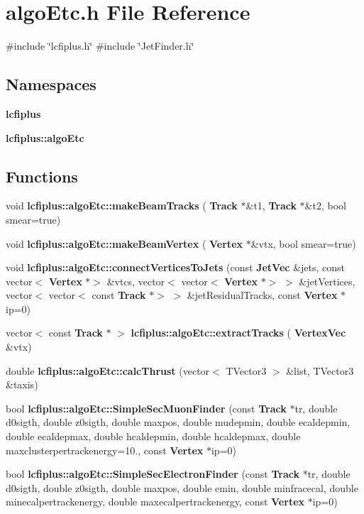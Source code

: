 \section{algo\+Etc.\+h File Reference}
\label{algoEtc_8h}
{\ttfamily \#include \char`\"{}lcfiplus.\+h\char`\"{}}\newline
{\ttfamily \#include \char`\"{}Jet\+Finder.\+h\char`\"{}}\newline
\subsection*{Namespaces}
\begin{DoxyCompactItemize}
\item 
 \textbf{ lcfiplus}
\item 
 \textbf{ lcfiplus\+::algo\+Etc}
\end{DoxyCompactItemize}
\subsection*{Functions}
\begin{DoxyCompactItemize}
\item 
void \textbf{ lcfiplus\+::algo\+Etc\+::make\+Beam\+Tracks} (\textbf{ Track} $\ast$\&t1, \textbf{ Track} $\ast$\&t2, bool smear=true)
\item 
void \textbf{ lcfiplus\+::algo\+Etc\+::make\+Beam\+Vertex} (\textbf{ Vertex} $\ast$\&vtx, bool smear=true)
\item 
void \textbf{ lcfiplus\+::algo\+Etc\+::connect\+Vertices\+To\+Jets} (const \textbf{ Jet\+Vec} \&jets, const vector$<$ \textbf{ Vertex} $\ast$$>$ \&vtcs, vector$<$ vector$<$ \textbf{ Vertex} $\ast$$>$ $>$ \&jet\+Vertices, vector$<$ vector$<$ const \textbf{ Track} $\ast$$>$ $>$ \&jet\+Residual\+Tracks, const \textbf{ Vertex} $\ast$ip=0)
\item 
vector$<$ const \textbf{ Track} $\ast$ $>$ \textbf{ lcfiplus\+::algo\+Etc\+::extract\+Tracks} (\textbf{ Vertex\+Vec} \&vtx)
\item 
double \textbf{ lcfiplus\+::algo\+Etc\+::calc\+Thrust} (vector$<$ T\+Vector3 $>$ \&list, T\+Vector3 \&taxis)
\item 
bool \textbf{ lcfiplus\+::algo\+Etc\+::\+Simple\+Sec\+Muon\+Finder} (const \textbf{ Track} $\ast$tr, double d0sigth, double z0sigth, double maxpos, double mudepmin, double ecaldepmin, double ecaldepmax, double hcaldepmin, double hcaldepmax, double maxclusterpertrackenergy=10., const \textbf{ Vertex} $\ast$ip=0)
\item 
bool \textbf{ lcfiplus\+::algo\+Etc\+::\+Simple\+Sec\+Electron\+Finder} (const \textbf{ Track} $\ast$tr, double d0sigth, double z0sigth, double maxpos, double emin, double minfracecal, double minecalpertrackenergy, double maxecalpertrackenergy, const \textbf{ Vertex} $\ast$ip=0)
\end{DoxyCompactItemize}
